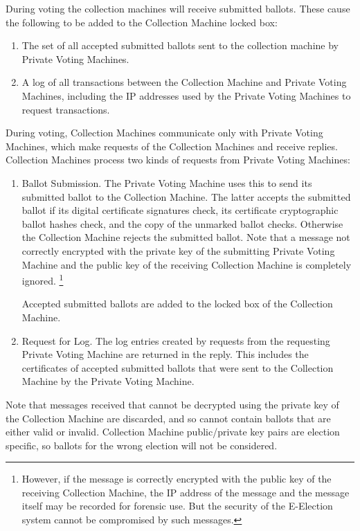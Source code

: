 \documentclass[12pt]{article}
\begin{document}
During voting the collection machines will
receive submitted ballots.  These cause the following to be
added to the Collection Machine locked box:

\begin{enumerate}
\setcounter{enumi}{\value{CML-COUNTER}}
\item The set of all accepted submitted ballots sent to the collection machine
by Private Voting Machines.
\item A log of all transactions between the Collection Machine and
Private Voting Machines, including the IP addresses used by
the Private Voting Machines to request transactions.
\setcounter{CML-COUNTER}{\value{enumi}}
\end{enumerate}


During voting, Collection Machines communicate only with
Private Voting Machines, which make requests of the Collection
Machines and receive replies.
Collection Machines process two kinds of requests from
Private Voting Machines:
\begin{enumerate}

\item
Ballot Submission.  The Private Voting Machine uses this to send
its submitted ballot to the Collection Machine.  The latter accepts
the submitted ballot if its digital certificate signatures check,
its certificate cryptographic ballot hashes check,
and the copy of the unmarked ballot checks.
Otherwise the Collection Machine rejects the submitted
ballot.  Note that a message not correctly encrypted with
the private key of the submitting Private Voting Machine and the
public key of the receiving Collection Machine is completely ignored.%
\footnote{However, if the message is correctly encrypted with the
public key of the receiving Collection Machine, the IP address
of the message and the message itself may be
recorded for forensic use.  But the security of the E-Election
system cannot be compromised by such messages.}

Accepted submitted ballots are added to the locked box of the
Collection Machine.

\item
Request for Log.  The log entries created by requests from the
requesting Private Voting Machine are returned in the reply.
This includes the certificates of accepted submitted ballots
that were sent to the Collection Machine
by the Private Voting Machine.

\end{enumerate}

Note that messages received that cannot be decrypted using the
private key of the Collection Machine
are discarded, and so cannot contain
ballots that are either valid or invalid.  Collection Machine
public/private key pairs are election specific, so ballots for
the wrong election will not be considered.
\end{document}
